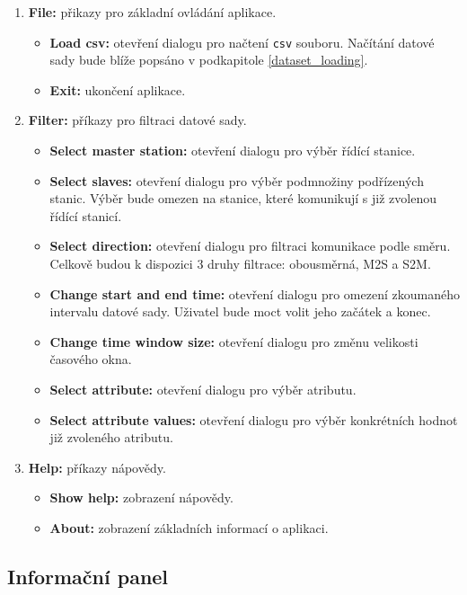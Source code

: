 \begin{enumerate}
    \item \textbf{File:} přikazy pro základní ovládání aplikace.
    \begin{itemize}
        \item \textbf{Load csv:} otevření dialogu pro načtení \texttt{csv} souboru. Načítání datové sady bude blíže popsáno v podkapitole \ref{dataset_loading}.
        \item \textbf{Exit:} ukončení aplikace.
    \end{itemize}
    
    \item \textbf{Filter:} příkazy pro filtraci datové sady.
    \begin{itemize}
        \item \textbf{Select master station:} otevření dialogu pro výběr řídící stanice.
        \item \textbf{Select slaves:} otevření dialogu pro výběr podmnožiny podřízených stanic. Výběr bude omezen na stanice, které komunikují s již zvolenou řídící stanicí.
        \item \textbf{Select direction:} otevření dialogu pro filtraci komunikace podle směru. Celkově budou k dispozici 3 druhy filtrace: obousměrná, M2S a S2M.
        \item \textbf{Change start and end time:} otevření dialogu pro omezení zkoumaného intervalu datové sady. Uživatel bude moct volit jeho začátek a konec.
        \item \textbf{Change time window size:} otevření dialogu pro změnu velikosti časového okna.
        \item \textbf{Select attribute:} otevření dialogu pro výběr atributu.
        \item \textbf{Select attribute values:} otevření dialogu pro výběr konkrétních hodnot již zvoleného atributu.
    \end{itemize}
    
    \item \textbf{Help:} příkazy nápovědy.
    \begin{itemize}
        \item \textbf{Show help:} zobrazení nápovědy.
        \item \textbf{About:} zobrazení základních informací o aplikaci.
    \end{itemize}
\end{enumerate}


\subsection*{Informační panel}


